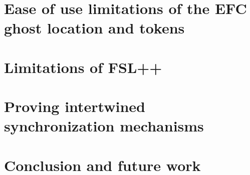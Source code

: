 \documentclass[titlepage,11pt,a4paper]{report}
\theoremstyle{plain}
\begin{document}

\chapter{Ease of use limitations of the EFC ghost location and tokens}



\chapter{Limitations of FSL++}


\chapter{Proving intertwined synchronization mechanisms}




\chapter{Conclusion and future work}

%



\appendix



\end{document}
